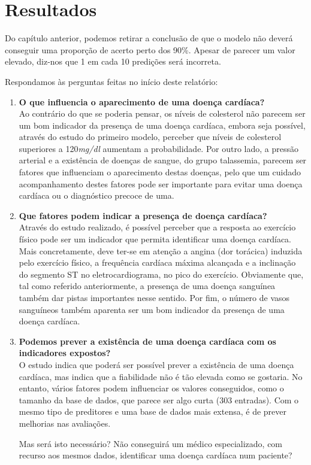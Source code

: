 \documentclass[a4paper]{report}
\begin{document}
\chapter{Resultados}
\large{
	Do capítulo anterior, podemos retirar a conclusão de que o modelo não deverá conseguir uma proporção de acerto perto dos 90\%. 
	Apesar de parecer um valor elevado, diz-nos que 1 em cada 10 predições será incorreta.

	Respondamos às perguntas feitas no início deste relatório:
	\begin{enumerate}
		\item \textbf{O que influencia o aparecimento de uma doença cardíaca?} \\
		Ao contrário do que se poderia pensar, os níveis de colesterol não parecem ser um bom indicador da presença de uma doença cardíaca, embora seja possível, 
		através do estudo do primeiro modelo, perceber que níveis de colesterol superiores a 120\textit{mg/dl} aumentam a probabilidade.
		Por outro lado, a pressão arterial e a existência de doenças de sangue, do grupo talassemia, parecem ser fatores que influenciam o aparecimento destas doenças, 
		pelo que um cuidado acompanhamento destes fatores pode ser importante para evitar uma doença cardíaca ou o diagnóstico precoce de uma. \\

		\item \textbf{Que fatores podem indicar a presença de doença cardíaca?} \\
		Através do estudo realizado, é possível perceber que a resposta ao exercício físico pode ser um indicador que permita identificar uma doença cardíaca.
		Mais concretamente, deve ter-se em atenção a angina (dor torácica) induzida pelo exercício físico, a frequência cardíaca máxima alcançada e a inclinação do segmento ST no eletrocardiograma, no pico do exercício.
		Obviamente que, tal como referido anteriormente, a presença de uma doença sanguínea também dar pistas importantes nesse sentido.
		Por fim, o número de vasos sanguíneos também aparenta ser um bom indicador da presença de uma doença cardíaca. \\

		\item \textbf{Podemos prever a existência de uma doença cardíaca com os indicadores expostos?} \\
		O estudo indica que poderá ser possível prever a existência de uma doença cardíaca, mas indica que a fiabilidade não é tão elevada como se gostaria.
		No entanto, vários fatores podem influenciar os valores conseguidos, como o tamanho da base de dados, que parece ser algo curta (303 entradas).
		Com o mesmo tipo de preditores e uma base de dados mais extensa, é de prever melhorias nas avaliações.

		Mas será isto necessário? Não conseguirá um médico especializado, com recurso aos mesmos dados, identificar uma doença cardíaca num paciente?
	\end{enumerate}
}
\end{document}
